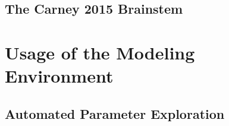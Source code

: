 \subsection{The Carney 2015 Brainstem} %
\label{sub:the_carney_2015_brainstem}


\section{Usage of the Modeling Environment} %
\label{sec:usage_of_the_modeling_environment}
\subsection{Automated Parameter Exploration} %
\label{sub:automated_parameter_exploration}

